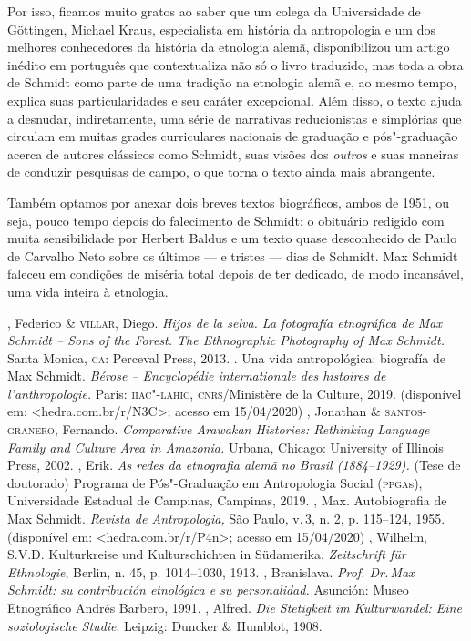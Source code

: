 Por isso, ficamos muito gratos ao saber que um colega da Universidade de Göttingen, Michael Kraus, especialista em história da antropologia e um dos melhores conhecedores da história da etnologia alemã, disponibilizou um artigo inédito em português que contextualiza não só o livro traduzido, mas toda a obra de Schmidt como parte de uma tradição na etnologia alemã e, ao mesmo tempo, explica suas particularidades e seu caráter excepcional. Além disso, o texto ajuda a desnudar, indiretamente, uma série de narrativas reducionistas e simplórias que circulam em muitas grades curriculares nacionais de graduação e pós"-graduação acerca de autores clássicos como Schmidt, suas visões dos \textit{outros} e suas maneiras de conduzir pesquisas de campo, o que torna o texto ainda mais abrangente.

Também optamos por anexar dois breves textos biográficos, ambos de 1951, ou seja, pouco tempo depois do falecimento de Schmidt: o obituário redigido com muita sensibilidade por Herbert Baldus e um texto quase desconhecido de Paulo de Carvalho Neto sobre os últimos --- e tristes --- dias de Schmidt. Max Schmidt faleceu em condições de miséria total depois de ter dedicado, de modo incansável, uma vida inteira à etnologia.

 \begin{bibliohedra}
 , Federico \& \textsc{villar}, Diego. \textit{Hijos de la selva. La
 fotografía etnográfica de Max Schmidt -- Sons of the Forest. The
 Ethnographic Photography of Max Schmidt.} Santa Monica, \textsc{ca}: Perceval
 Press, 2013.
 \titidem. Una vida antropológica: biografía de Max Schmidt.
 \textit{Bérose -- Encyclopédie internationale des histoires de
 l'anthropologie.} Paris: \textsc{iiac"-lahic}, \textsc{cnrs}/Ministère de la Culture, 2019.
 (disponível em:
 \textless{}hedra.com.br/r/N3C\textgreater{};
 acesso em 15/04/2020)
 , Jonathan \& \textsc{santos-granero}, Fernando. \textit{Comparative
 Arawakan Histories: Rethinking Language Family and Culture Area in
 Amazonia\textit{.}} Urbana, Chicago: University of Illinois Press, 2002.
 , Erik. \textit{As redes da etnografia alemã no Brasil
 (1884--1929).} (Tese de doutorado) Programa de Pós"-Graduação em
 Antropologia Social (\textsc{ppga}s), Universidade Estadual de Campinas,
 Campinas, 2019.
 , Max. Autobiografia de Max Schmidt. \textit{Revista de
 Antropologia,} São Paulo, v.\,3, n. 2, p. 115--124, 1955. (disponível em:
 \textless{}hedra.com.br/r/P4n\textgreater{};
 acesso em 15/04/2020)
 , Wilhelm, S.V.D. Kulturkreise und Kulturschichten in Südamerika.
 \textit{Zeitschrift für Ethnologie}, Berlin, n. 45, p. 1014--1030,
 1913.
 , Branislava. \textit{Prof. Dr.\,Max Schmidt: su contribución
 etnológica e su personalidad.} Asunción: Museo Etnográfico Andrés
 Barbero, 1991.
 , Alfred. \textit{Die Stetigkeit im Kulturwandel: Eine
 soziologische Studie}. Leipzig: Duncker \& Humblot, 1908.
 \end{bibliohedra}

